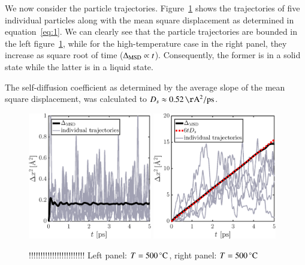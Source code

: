 We now consider the particle trajectories. Figure~\ref{fig:MSD} shows the trajectories of five individual particles along with the mean square displacement as determined in equation~\eqref{eq:1}. We can clearly see that the particle trajectories are bounded in the left figure~\ref{fig:MSD}, while for the high-temperature case in the right panel, they increase as square root of time ($\Delta_{\rm MSD} \propto t$). Consequently, the former is in a solid state while the latter is in a liquid state. 

The self-diffusion coefficient as determined by the average slope of the mean square displacement, was calculated to $D_s \approx \unit[0.52]{\AA^2/ps}$.  

\begin{figure}[!ht]
\begin{center}
  \includegraphics[width=0.48\textwidth]{../figures/MSD-500} 
    \includegraphics[width=0.48\textwidth]{../figures/MSD-700} 
  \caption{!!!!!!!!!!!!!!!!!!!!!!!! Left panel: $T=\unit[500]{^\circ C}$,  right panel: $T=\unit[500]{^\circ C}$}
  \label{fig:MSD}
\end{center}
\end{figure}




